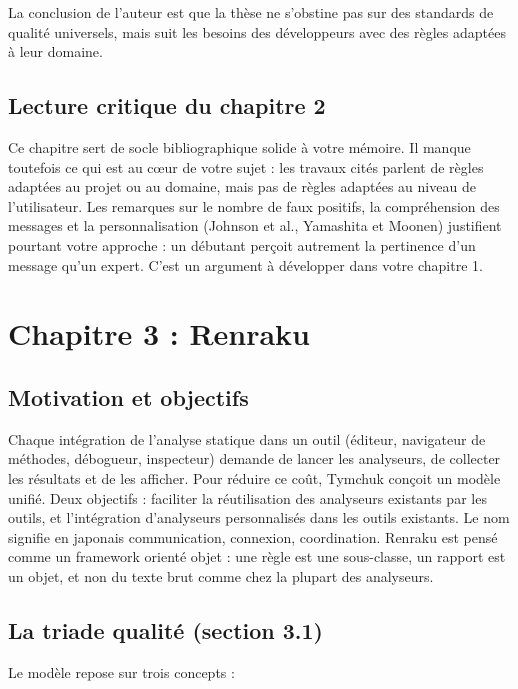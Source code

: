 \documentclass[11pt,a4paper]{article}
\begin{document}
La conclusion de l’auteur est que la thèse ne s’obstine pas sur des standards de qualité universels, mais suit les besoins des développeurs avec des règles adaptées à leur domaine.

\subsection{Lecture critique du chapitre 2}

Ce chapitre sert de socle bibliographique solide à votre mémoire. Il manque toutefois ce qui est au cœur de votre sujet : les travaux cités parlent de règles adaptées au projet ou au domaine, mais pas de règles adaptées au niveau de l’utilisateur. Les remarques sur le nombre de faux positifs, la compréhension des messages et la personnalisation (Johnson et al., Yamashita et Moonen) justifient pourtant votre approche : un débutant perçoit autrement la pertinence d’un message qu’un expert. C’est un argument à développer dans votre chapitre 1.

\section{Chapitre 3 : Renraku}

\subsection{Motivation et objectifs}

Chaque intégration de l’analyse statique dans un outil (éditeur, navigateur de méthodes, débogueur, inspecteur) demande de lancer les analyseurs, de collecter les résultats et de les afficher. Pour réduire ce coût, Tymchuk conçoit un modèle unifié. Deux objectifs : faciliter la réutilisation des analyseurs existants par les outils, et l’intégration d’analyseurs personnalisés dans les outils existants. Le nom signifie en japonais communication, connexion, coordination. Renraku est pensé comme un framework orienté objet : une règle est une sous-classe, un rapport est un objet, et non du texte brut comme chez la plupart des analyseurs.

\subsection{La triade qualité (section 3.1)}

Le modèle repose sur trois concepts :
\end{document}
